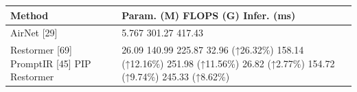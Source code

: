 \begin{tabular}{ll}
\toprule
Method & Param. (M) FLOPS (G) Infer. (ms) \\
\midrule
AirNet [29] & 5.767 301.27 417.43 \\
Restormer [69] PromptIR [45] PIP Restormer & 26.09 140.99 225.87 32.96 (↑26.32\%) 158.14 (↑12.16\%) 251.98 (↑11.56\%) 26.82 (↑2.77\%) 154.72 (↑9.74\%) 245.33 (↑8.62\%) \\
\bottomrule
\end{tabular}
